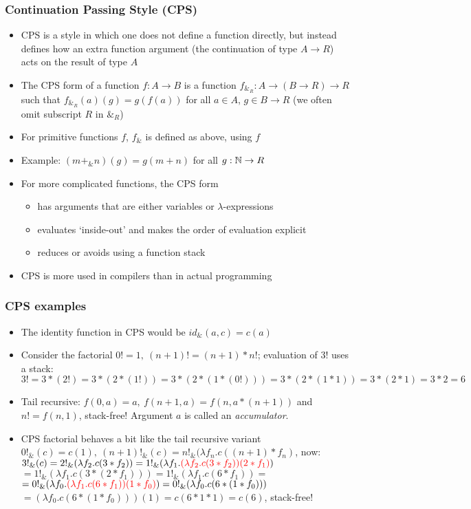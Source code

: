\documentclass[handout]{beamer}
\begin{document}
\frame
  {   
    \frametitle{Continuation Passing Style (CPS)}\label{Mon5:CPS}

 \begin{itemize}[<+->]
\item CPS is a style in which one does not define a function directly, but instead
defines how an extra function argument (the continuation of type $A\to R$) 
acts on the result of type $A$
\item The CPS form of a function $f: A\to B$ is a function $f_{\&_R} : A\to(B\to R)\to R$
such that $f_{\&_R} (a)(g) = g(f(a))$ for all $a\in A$, $g\in B\to R$ 
(we often omit subscript $R$ in $\&_R$)
\item For primitive functions $f$, $f_\&$ is defined as above, using $f$
\item Example: $(m+_\& n)(g) = g(m+n)$ for all $g:\mathbb{N}\to R$
\item For more complicated functions, the CPS form
\begin{itemize}
    \item has arguments that are either variables or $\lambda$-expressions
    \item evaluates `inside-out' and makes the order of evaluation explicit
    \item reduces or avoids using a function stack
 \end{itemize}
\item CPS is more used in compilers than in actual programming
 \end{itemize}

 }

\frame
  {   
    \frametitle{CPS examples}\label{Mon5:CPS}

 \begin{itemize}[<+->]
\item The identity function in CPS would be $id_\& (a,c) = c(a)$
\item Consider the factorial $0! = 1,~(n+1)! = (n+1)*n!$; evaluation of 3! uses a stack:
$3! = 3*(2!) = 3*(2*(1!)) = 3*(2*(1*(0!))) = 3*(2*(1*1)) = 3*(2*1) = 3*2 = 6$
\item Tail recursive: $f(0,a) = a,~f(n+1,a) = f(n,a*(n+1))$ and $n! = f(n,1)$, stack-free!
Argument $a$ is called an \emph{accumulator}.
\item CPS factorial behaves a bit like the tail recursive variant
$0!_\&(c) = c(1),~(n+1)!_\&(c) = n!_\&(\lambda f_n. c((n+1)*f_n)$, now:\vspace*{2mm}
$3!_\&(c) = 2!_\&(\lambda f_2. c(3*f_2)) = 1!_\&(\lambda f_1. 
{\color{red}(\lambda f_2. c(3*f_2))(2*f_1)})$
$= 1!_\&(\lambda f_1. c(3*(2*f_1))) = 1!_\&(\lambda f_1. c(6*f_1)) =$
$= 0!_\&(\lambda f_0. 
{\color{red}(\lambda f_1. c(6*f_1))(1*f_0)}) = 0!_\&(\lambda f_0. c(6*(1*f_0))) $
$= (\lambda f_0. c(6*(1*f_0))) (1) = c(6*1*1) = c(6)$, stack-free!
\end{itemize}

 }
\end{document}
